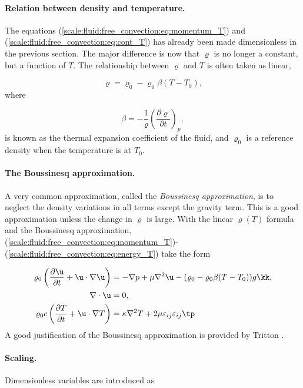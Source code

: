 \documentclass[graybox,envcountchap,sectrefs,final]{svmonodo}
\begin{document}
\paragraph{Relation between density and temperature.}
The equations (\ref{scale:fluid:free_convection:eq:momentum_T}) and
(\ref{scale:fluid:free_convection:eq:cont_T}) has already been made dimensionless
in the previous section. The major difference is now that $\varrho$
is no longer a constant, but a function of $T$.
The relationship between $\varrho$ and $T$ is often taken as
linear,

\[ \varrho = \varrho_0 -\varrho_0 \beta (T-T_0),\]
where

\[ \beta = -\frac{1}{\varrho}\left(\frac{\partial\varrho}{\partial t}
\right)_p,\]
is known as the thermal expansion coefficient of the fluid,
and $\varrho_0$ is a reference density when the temperature is at $T_0$.


\paragraph{The Boussinesq approximation.}
A very common approximation, called the \emph{Boussinesq approximation}, is
to neglect the density variations in all terms except the gravity term.
This is a good approximation unless the change in $\varrho$ is large.
With the linear $\varrho(T)$ formula and the Boussinesq approximation,
(\ref{scale:fluid:free_convection:eq:momentum_T})-(\ref{scale:fluid:free_convection:eq:energy_T})
take the form

\begin{align}
\varrho_0\left(\frac{\partial \u}{\partial t} + \u\cdot\nabla\u\right)
&= -\nabla p + \mu\nabla^2\u - (\varrho_0 - \varrho_0\beta(T-T_0))g\kk,
\label{scale:fluid:free_convection:eq:momentum_TB}\\ 
\nabla\cdot\u & = 0,
\label{scale:fluid:free_convection:eq:cont_TB}\\ 
\varrho_0 c\left(\frac{\partial T}{\partial t} + \u\cdot\nabla T\right)
&= \kappa\nabla^2 T + 2\mu\varepsilon_{ij}\varepsilon_{ij}\tp
\label{scale:fluid:free_convection:eq:energy_TB}
\end{align}
A good justification of the Boussinesq approximation is provided
by Tritton \cite[Ch.~13]{Tritton}.

\paragraph{Scaling.}
Dimensionless variables are introduced as
\end{document}
